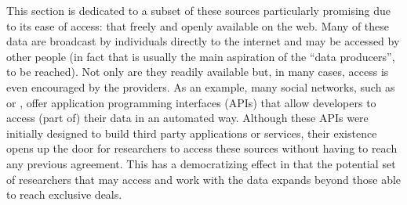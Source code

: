 \documentclass[12pt]{article}
\begin{document}
This section is dedicated to a subset of these sources particularly promising due to
its ease of access: that freely and openly available on the web. 
Many of these data are broadcast by individuals directly to the internet and may be
accessed by other people (in fact that is usually the main aspiration of the ``data
producers'', to be reached). 
Not only are they readily available but, in many cases, access is even encouraged by the
providers. As an example, many social networks, such as \cite{facebook} or \cite{twitter},
offer application programming interfaces (APIs) that allow developers to
access (part of) their data in an automated way. Although these APIs were
initially designed to build third party applications or services, their
existence opens up the door for researchers to access these
sources without having to reach any previous
agreement. This has a democratizing effect in that the potential set of
researchers that may access and work with the data expands beyond those able
to reach exclusive deals.
\end{document}
